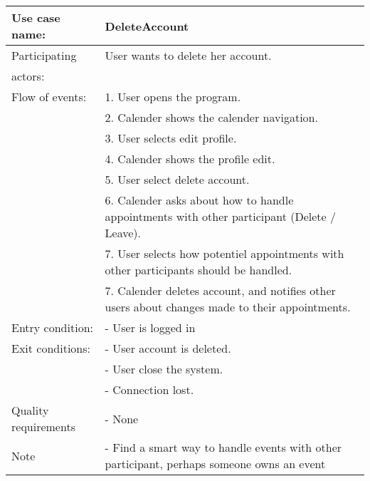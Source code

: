 {\tabulinesep=1.2mm
\begin{tabu}{ | p{3cm} | p{13cm} |}
    \hline
    Use case name: 			& 		DeleteAccount\\ \hline
    Participating  			& 		User wants to delete her account. \\
    actors:					& 		\\ \hline
    Flow of events: 		& 		1. User opens the program. \\
							&		2. Calender shows the calender navigation.\\
							&		3. User selects edit profile.\\
							&		4. Calender shows the profile edit.\\
							&		5. User select delete account.\\
							&		6. Calender asks about how to handle appointments with other participant (Delete / Leave).\\
							&		7. User selects how potentiel appointments with other participants should be handled. \\
							&		7. Calender deletes account, and notifies other users about changes made to their appointments. \\\hline
    Entry condition: 		& 		- User is logged in  \\ \hline
	Exit conditions: 		&		- User account is deleted.\\
							&		- User close the system.\\
							&		- Connection lost.\\\hline
	Quality requirements	&	 	- None \\\hline
	Note					&	 	- Find a smart way to handle events with other participant, perhaps someone owns an event \\\hline
\end{tabu}
}